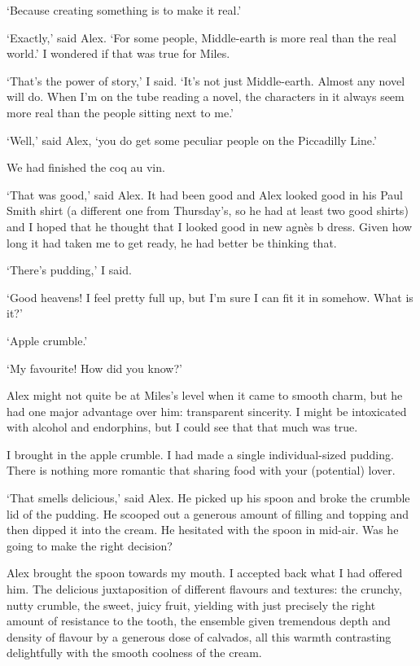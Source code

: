 `Because creating something is to make it real.'

`Exactly,' said Alex. `For some people, Middle-earth is more real
than the real world.' I wondered if that was true for Miles.

`That's the power of story,' I said. `It's not just Middle-earth.
Almost any novel will do. When I'm on the tube reading a novel, the
characters in it always seem more real than the people sitting next
to me.'

`Well,' said Alex, `you do get some peculiar people on the
Piccadilly Line.'

We had finished the coq au vin.

`That was good,' said Alex. It had been good and Alex looked good in
his Paul Smith shirt (a different one from Thursday's, so he had at
least two good shirts) and I hoped that he thought that I looked
good in new agn{\`e}s b dress. Given how long it had taken me to get
ready, he had better be thinking that.

`There's pudding,' I said.

`Good heavens! I feel pretty full up, but I'm sure I can fit it in
somehow. What is it?'

`Apple crumble.'

`My favourite! How did you know?'

Alex might not quite be at Miles's level when it came to smooth
charm, but he had one major advantage over him: transparent
sincerity. I might be intoxicated with alcohol and endorphins, but I
could see that that much was true.

I brought in the apple crumble. I had made a single individual-sized
pudding. There is nothing more romantic that sharing food with your
(potential) lover.

`That smells delicious,' said Alex. He picked up his spoon and broke
the crumble lid of the pudding. He scooped out a generous amount of
filling and topping and then dipped it into the cream. He hesitated
with the spoon in mid-air. Was he going to make the right decision?

Alex brought the spoon towards my mouth. I accepted back what I had
offered him. The delicious juxtaposition of different flavours and
textures: the crunchy, nutty crumble, the sweet, juicy fruit,
yielding with just precisely the right amount of resistance to the
tooth, the ensemble given tremendous depth and density of flavour by
a generous dose of calvados, all this warmth contrasting
delightfully with the smooth coolness of the cream.

